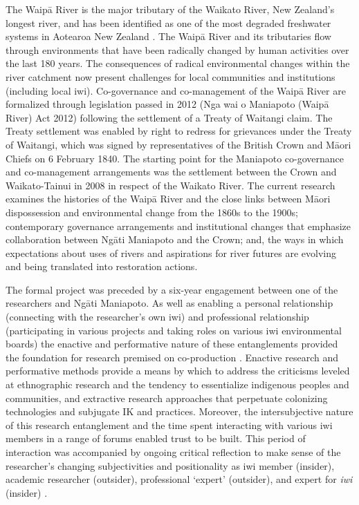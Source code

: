 \documentclass[10pt,a4paper]{article}
\begin{document}
\begin{multicols}{2}
The Waip\={a} River is the major tributary of the Waikato River, New Zealand's longest river, and has been identified as one of the most degraded freshwater systems in Aotearoa New Zealand \citep{r33, r34}. The Waip\={a} River and its tributaries flow through environments that have been radically changed by human activities over the last 180 years. The consequences of radical environmental changes within the river catchment now present challenges for local communities and institutions (including local iwi). Co-governance and co-management of the Waip\={a} River are formalized through legislation passed in 2012 (Nga wai o Maniapoto (Waip\={a} River) Act 2012) following the settlement of a Treaty of Waitangi claim. The Treaty settlement was enabled by right to redress for grievances under the Treaty of Waitangi, which was signed by representatives of the British Crown and M\={a}ori Chiefs on 6 February 1840. The starting point for the Maniapoto co-governance and co-management arrangements was the settlement between the Crown and Waikato-Tainui in 2008 in respect of the Waikato River. The current research examines the histories of the Waip\={a} River and the close links between M\={a}ori dispossession and environmental change from the 1860s to the 1900s; contemporary governance arrangements and institutional changes that emphasize collaboration between Ng\={a}ti Maniapoto and the Crown; and, the ways in which expectations about uses of rivers and aspirations for river futures are evolving and being translated into restoration actions.

The formal project was preceded by a six-year engagement between one of the researchers and Ng\={a}ti Maniapoto. As well as enabling a personal relationship (connecting with the researcher's
own iwi) and professional relationship (participating in various projects and taking roles on various iwi environmental boards) the enactive and performative nature of these entanglements provided the foundation for research premised on co-production \citep{r35, r36}. Enactive research and performative methods provide a means by which to address the criticisms leveled at ethnographic research and the tendency to essentialize indigenous peoples and communities, and extractive research approaches that perpetuate colonizing technologies and subjugate IK and practices. Moreover, the intersubjective nature of this research entanglement \citep{r36, r37} and the time spent interacting with various iwi members in a range of forums enabled trust to be built. This period of interaction was accompanied by ongoing critical reflection to make sense of the researcher's changing subjectivities and positionality as iwi member (insider), academic researcher (outsider), professional `expert' (outsider), and expert for \textit{iwi} (insider) \citep{r38, r39}.


\end{multicols}
\end{document}
